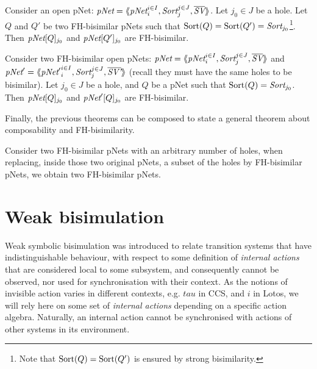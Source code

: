 \documentclass{lncs/llncs}
\begin{document}
\begin{theorem}[Congruence]\label{thm-congr-eq}
	Consider an open pNet:
	$\pNet = \mylangle \pNet_i^{i\in I}, \Sort_j^{j\in J}, 
	\overline{\symb{SV}}\myrangle$.
	Let $j_0\in J$ be a hole. Let $Q$ and $Q'$ be two FH-bisimilar pNets such that 
	$\Sortop(Q)=\Sortop(Q')=\Sort_{j_0}$\footnote{Note that $\operatorname{Sort}(Q)=\operatorname{Sort}(Q')$ is 
	ensured by 
	strong bisimilarity.}. Then 
	$\pNet[Q]_{j_0}$ and 
	$\pNet[Q']_{j_0}$ are FH-bisimilar.
\end{theorem}

\begin{theorem}\label{thm-ctxt-eq}
	Consider two FH-bisimilar open pNets:
	$\pNet = \mylangle \pNet_i^{i\in I}, \Sort_j^{j\in J}, 
	\overline{\symb{SV}}\myrangle$ and 	$\pNet' = \mylangle {\pNet'}_i^{i\in I}, 
	\Sort_j^{j\in 
	J}, 	\overline{\symb{SV'}}\myrangle$ 
	(recall they must have the same holes to be bisimilar).
	Let $j_0\in J$ be a hole, and $Q$ be a pNet such that $\Sortop(Q)=\Sort_{j_0}$. Then 
	$\pNet[Q]_{j_0}$ and 
	$\pNet'[Q]_{j_0}$ are FH-bisimilar.
\end{theorem}

Finally, the previous theorems can be composed to state a general theorem about 
composability and FH-bisimilarity.
\begin{corollary}[Composability]
	Consider two FH-bisimilar pNets with an arbitrary number of holes, when replacing, 
	inside those two original pNets, a subset of the holes by FH-bisimilar pNets, we 
	obtain two FH-bisimilar pNets.
\end{corollary}
%


\section{Weak bisimulation}

Weak symbolic bisimulation was introduced to relate transition systems
that have indistinguishable behaviour, with respect to some definition
of \emph{internal actions} that are considered local to some
subsystem, and consequently cannot be observed, nor used for
synchronisation with their context.
As the notions of invisible action varies in different contexts,
e.g. $tau$ in CCS, and $i$ in Lotos, we will rely here on some set of
\emph{internal actions} depending on a specific action
algebra. Naturally, an internal action cannot be synchronised with
actions of other systems in its environment. 
\end{document}
